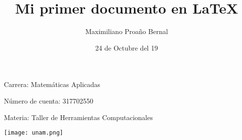 \documentclass{article} %
\title{Mi primer documento en LaTeX}
\author{Maximiliano Proaño Bernal}
\date{24 de Octubre del 19}
\begin{document}
	\begin{titlepage}
		\maketitle
	\end{titlepage}

Carrera: Matemáticas Aplicadas

Número de cuenta: 317702550

Materia: Taller de Herramientas Computacionales
\vfill

\texttt{[image: unam.png]}
\end{document}
